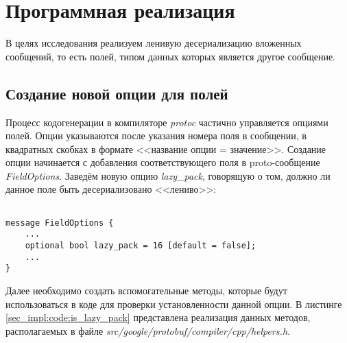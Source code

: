 \section{Программная реализация}

В целях исследования реализуем ленивую десериализацию вложенных сообщений, то есть полей, типом данных которых является другое сообщение.

\subsection{Создание новой опции для полей}

Процесс кодогенерации в компиляторе \textit{protoc} частично управляется опциями полей.
Опции указываются после указания номера поля в сообщении, в квадратных скобках в формате <<название опции = значение>>.
Создание опции начинается с добавления соответствующего поля в proto-сообщение \textit{FieldOptions}.
Заведём новую опцию \textit{lazy\_pack}, говорящую о том, должно ли данное поле быть десериализовано <<лениво>>:
\begin{lstlisting}[style=CodeListing]

message FieldOptions {
    ...
    optional bool lazy_pack = 16 [default = false];
    ...
}

\end{lstlisting}

Далее необходимо создать вспомогательные методы, которые будут использоваться в коде для проверки установленности данной опции.
В листинге \ref{sec_impl:code:is_lazy_pack} представлена реализация данных методов, располагаемых в файле \textit{src/google/protobuf/compiler/cpp/helpers.h}.


